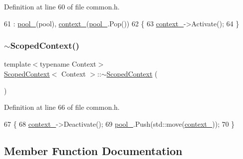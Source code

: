 Definition at line 60 of file common.\+h.


\begin{DoxyCode}
61         : \mbox{\hyperlink{class_scoped_context_a6aa628deb422cd0304c7b2eb311f8185}{pool\_}}(pool), \mbox{\hyperlink{class_scoped_context_afe2f4971fc3620e98791cc844454956e}{context\_}}(\mbox{\hyperlink{class_scoped_context_a6aa628deb422cd0304c7b2eb311f8185}{pool\_}}.Pop())
62     \{
63         \mbox{\hyperlink{class_scoped_context_afe2f4971fc3620e98791cc844454956e}{context\_}}->Activate();
64     \}
\end{DoxyCode}
\mbox{\label{class_scoped_context_a1bdbdb322975a0ea7d35262385b81476}} 
\subsubsection{\texorpdfstring{$\sim$\+Scoped\+Context()}{~ScopedContext()}}
{\footnotesize\ttfamily template$<$typename Context$>$ \\
\mbox{\hyperlink{class_scoped_context}{Scoped\+Context}}$<$ Context $>$\+::$\sim$\mbox{\hyperlink{class_scoped_context}{Scoped\+Context}} (\begin{DoxyParamCaption}{ }\end{DoxyParamCaption})\hspace{0.3cm}{\ttfamily [inline]}}



Definition at line 66 of file common.\+h.


\begin{DoxyCode}
67     \{
68         \mbox{\hyperlink{class_scoped_context_afe2f4971fc3620e98791cc844454956e}{context\_}}->Deactivate();
69         \mbox{\hyperlink{class_scoped_context_a6aa628deb422cd0304c7b2eb311f8185}{pool\_}}.Push(std::move(\mbox{\hyperlink{class_scoped_context_afe2f4971fc3620e98791cc844454956e}{context\_}}));
70     \}
\end{DoxyCode}


\subsection{Member Function Documentation}
\mbox{\label{class_scoped_context_af8a201a083905cf9c02c53d5992e7488}} 
